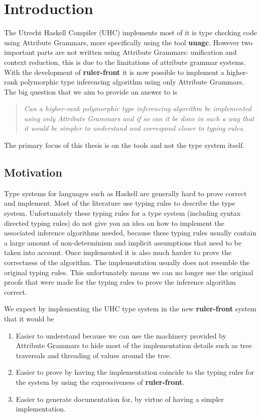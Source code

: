 \chapter{Introduction}
The Utrecht Haskell Compiler (UHC\cite{UHC}) implements most of it is type checking code using Attribute Grammars, more specifically using the tool \textbf{uuagc}\cite{uuagc}. However two important parts are not written using Attribute Grammars: unification and context reduction, this is due to the limitations of attribute grammar systems. With the development of \textbf{ruler-front}\cite{ruler-front} it is now possible to implement a higher-rank polymorphic type inferencing algorithm using only Attribute Grammars. The big question that we aim to provide an answer to is 

\begin{quotation}
\emph{Can a higher-rank polymorphic type inferencing algorithm be implemented using only Attribute Grammars and if so can it be done in such a way that it would be simpler to understand and correspond closer to typing rules}.
\end{quotation}

The primary focus of this thesis is on the tools and not the type system itself.

\section{Motivation}
Type systems for languages such as Haskell are generally hard to prove correct and implement. Most of the literature use typing rules to describe the type system. Unfortunately these typing rules for a type system (including syntax directed typing rules) do not give you an idea on how to implement the associated inference algorithms needed, because these typing rules usually contain a large amount of non-determinism and implicit assumptions that need to be taken into account.
Once implemented it is also much harder to prove the correctness of the algorithm. The implementation usually does not resemble the original typing rules. This unfortunately means we can no longer use the original proofs that were made for the typing rules to prove the inference algorithm correct.

We expect by implementing the UHC type system in the new \textbf{ruler-front} system that it would be

\begin{enumerate}
\item Easier to understand because we can use the machinery provided by Attribute Grammars to hide most of the implementation details such as tree traversals and threading of values around the tree.
\item Easier to prove by having the implementation coincide to the typing rules for the system by using the expressiveness of \textbf{ruler-front}.
\item Easier to generate documentation for, by virtue of having a simpler implementation.
\end{enumerate}

